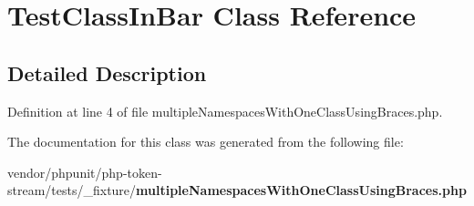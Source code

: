 \section{Test\+Class\+In\+Bar Class Reference}
\label{class_foo_1_1_bar_1_1_test_class_in_bar}


\subsection{Detailed Description}


Definition at line 4 of file multiple\+Namespaces\+With\+One\+Class\+Using\+Braces.\+php.



The documentation for this class was generated from the following file\+:\begin{DoxyCompactItemize}
\item 
vendor/phpunit/php-\/token-\/stream/tests/\+\_\+fixture/{\bf multiple\+Namespaces\+With\+One\+Class\+Using\+Braces.\+php}\end{DoxyCompactItemize}
